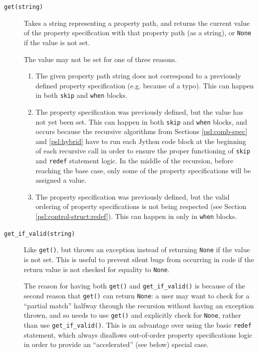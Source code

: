 \documentclass{article}
\begin{document}
\begin{description}

\item[{\tt get(string)} ] \mbox{}

Takes a string representing a property path, and returns the current value of the property specification with that property path (as a string), or {\tt None} if the value is not set.

The value may not be set for one of three reasons.

\begin{enumerate}

\item The given property path string does not correspond to a previously defined property specification (e.g. because of a typo). This can happen in both {\tt skip} and {\tt when} blocks.

\item The property specification was previously defined, but the value has not yet been set. This can happen in both {\tt skip} and {\tt when} blocks, and occurs because the recursive algorithms from Sections \ref{psl:comb-spec} and \ref{psl:hybrid} have to run each Jython code block at the beginning of each recursive call in order to ensure the proper functioning of {\tt skip} and {\tt redef} statement logic. In the middle of the recursion, before reaching the base case, only some of the property specifications will be assigned a value.

\item The property specification was previously defined, but the valid ordering of property specifications is not being respected (see Section \ref{psl:control-struct:redef}). This can happen in only in {\tt when} blocks.

\end{enumerate}

\item[{\tt get\_if\_valid(string)} ] \mbox{}

Like {\tt get()}, but throws an exception instead of returning {\tt None} if the value is not set. This is useful to prevent silent bugs from occurring in code if the return value is not checked for equality to {\tt None}.

The reason for having both {\tt get()} and {\tt get\_if\_valid()} is because of the second reason that {\tt get()} can return {\tt None}: a user may want to check for a ``partial match'' halfway through the recursion without having an exception thrown, and so needs to use {\tt get()} and explicitly check for {\tt None}, rather than use {\tt get\_if\_valid()}. This is an advantage over using the basic {\tt redef} statement, which always disallows out-of-order property specifications logic in order to provide an ``accelerated'' (see below) special case.


\end{description}
\end{document}
